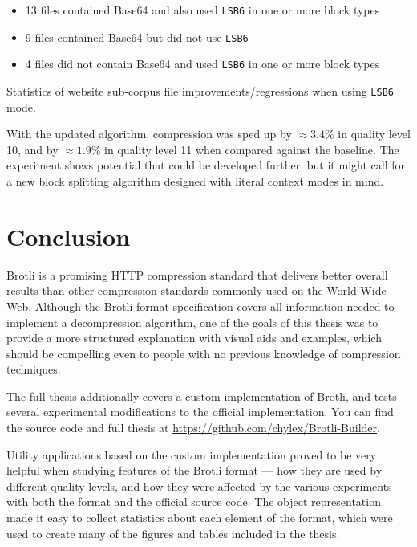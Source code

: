 \documentclass[english,master,dept460,male,cpp,cpdeclaration]{diploma}
\newif\ifSIMPLIFIED
\newcommand{\nosep}{\itemsep0em}
\newcommand{\texfigure}[1]{
}
\begin{document}
			\begin{itemize} \nosep
				\item 13 files contained Base64 and also used \verb|LSB6| in one or more block types
				\item 9 files contained Base64 but did not use \verb|LSB6|
				\item 4 files did not contain Base64 and used \verb|LSB6| in one or more block types
			\end{itemize}
			
			\begin{table}[H]
				\centering
				\caption{Statistics of website sub-corpus file improvements/regressions when using \texttt{LSB6} mode.}
				\label{table:multi-lcm-base64-details}
				\texfigure{multi-lcm-base64-details}
			\end{table}
			
			\noindent
			With the updated algorithm, compression was sped up by $\approx 3.4 \%$ in quality level 10, and by $\approx 1.9 \%$ in quality level 11 when compared against the baseline. The experiment shows potential that could be developed further, but it might call for a new block splitting algorithm designed with literal context modes in mind.
			
	\fi %

\section{Conclusion}

Brotli is a promising HTTP compression standard that delivers better overall results than other compression standards commonly used on the World Wide Web. Although the Brotli format specification\cite{RFC7932} covers all information needed to implement a decompression algorithm, one of the goals of this thesis was to provide a more structured explanation with visual aids and examples, which should be compelling even to people with no previous knowledge of compression techniques.

\ifSIMPLIFIED

The full thesis additionally covers a custom implementation of Brotli, and tests several experimental modifications to the official implementation. You can find the source code and full thesis at \url{https://github.com/chylex/Brotli-Builder}.

\else
	
Utility applications based on the custom implementation proved to be very helpful when studying features of the Brotli format --- how they are used by different quality levels, and how they were affected by the various experiments with both the format and the official source code. The object representation made it easy to collect statistics about each element of the format, which were used to create many of the figures and tables included in the thesis.
\end{document}
